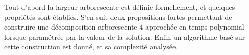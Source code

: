 

Tout d'abord la largeur arborescente est définie formellement, et quelques propriétés
sont établies. S'en suit deux propositions fortes permettant de construire une
décomposition arborescente $4$-approchée en temps polynomial lorsque paramétrée par
la valeur de la solution.
Enfin un algorithme basé sur cette construction est donné, et sa complexité analysée.


